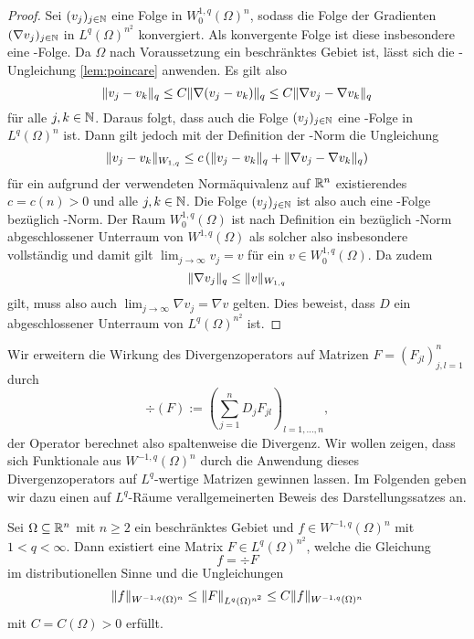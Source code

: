 \begin{proof}
  Sei $(v_j)_{j \in \mathbb{N}}$ eine Folge in $W_0^{1,q}(\Omega)^n$, sodass die Folge der Gradienten $(\nabla v_j)_{j \in \mathbb{N}}$ in $L^q(\Omega)^{n^2}$ konvergiert.
  Als konvergente Folge ist diese insbesondere eine \cauchy\hyp{}Folge.
  Da $\Omega$ nach Voraussetzung ein beschränktes Gebiet ist, lässt sich die \poincare\hyp{}Ungleichung \ref{lem:poincare} anwenden.
  Es gilt also
  $$
  \lVert v_j - v_k \rVert_q \leq C \lVert \nabla(v_j - v_k) \rVert_q \leq C \lVert \nabla v_j - \nabla v_k \rVert_q
  $$
  für alle $j,k \in \mathbb{N}$.
  Daraus folgt, dass auch die Folge $(v_j)_{j \in \mathbb{N}}$ eine \cauchy\hyp{}Folge in $L^q(\Omega)^n$ ist.
  Dann gilt jedoch mit der Definition der \sobolev\hyp{}Norm die Ungleichung
  $$
  \lVert v_j - v_k \rVert_{W_{1,q}} \leq c\, (\lVert v_j - v_k \rVert_q + \lVert \nabla v_j - \nabla v_k \rVert_q)
  $$
  für ein aufgrund der verwendeten Normäquivalenz auf $\mathbb{R}^n$ existierendes $c = c(n) > 0$ und alle $j,k \in \mathbb{N}$.
  Die Folge $(v_j)_{j \in \mathbb{N}}$ ist also auch eine \cauchy\hyp{}Folge bezüglich \sobolev\hyp{}Norm.
  Der Raum $W_0^{1,q}(\Omega)$ ist nach Definition ein bezüglich \sobolev\hyp{}Norm abgeschlossener Unterraum von $W^{1,q}(\Omega)$ als solcher also insbesondere vollständig und damit gilt $\lim_{j \to \infty} v_j = v$ für ein $v \in W_0^{1,q}(\Omega)$.
  Da zudem
  $$
  \lVert \nabla v_j \rVert_q \leq \lVert v \rVert_{W_{1,q}}  
  $$
  gilt, muss also auch $\lim_{j \to \infty} \nabla v_j = \nabla v$ gelten.
  Dies beweist, dass $D$ ein abgeschlossener Unterraum von $L^q(\Omega)^{n^2}$ ist.
\end{proof}

Wir erweitern die Wirkung des Divergenzoperators auf Matrizen $F = (F_{jl})_{j,l=1}^n$ durch
\begin{equation}
  \label{eq:divMatrix}
  \div(F) := (\sum_{j = 1}^n D_j F_{jl})_{l = 1,\dots,n},
\end{equation}
der Operator berechnet also spaltenweise die Divergenz.
Wir wollen zeigen, dass sich Funktionale aus $W^{-1,q}(\Omega)^n$ durch die Anwendung dieses Divergenzoperators auf $L^q$\hyp{}wertige Matrizen gewinnen lassen.
Im Folgenden geben wir dazu einen auf $L^q$\hyp{}Räume verallgemeinerten Beweis des Darstellungssatzes \cite[S.61, Lemma 1.6.1]{sohr2001navier} an.

\begin{lem}
  \label{lem:divRepresentation}
  Sei $\Omega \subseteq \mathbb{R}^n$ mit $n \geq 2$ ein beschränktes Gebiet und $f \in W^{-1,q}(\Omega)^n$ mit $1 < q < \infty$.
  Dann existiert eine Matrix $F \in L^q(\Omega)^{n^2}$, welche die Gleichung
  $$ f = \div F $$
  im distributionellen Sinne und die Ungleichungen
  \begin{equation}
    \label{eq:ineqDivRepresentation}
    \lVert  f  \rVert_{W^{-1,q}(\Omega)^n} 
    \leq \lVert  F  \rVert_{L^q(\Omega)^{n^2}} 
    \leq C \lVert  f  \rVert_{W^{-1,q}(\Omega)^n}
  \end{equation}
  mit $C = C(\Omega) > 0$ erfüllt.
\end{lem}

